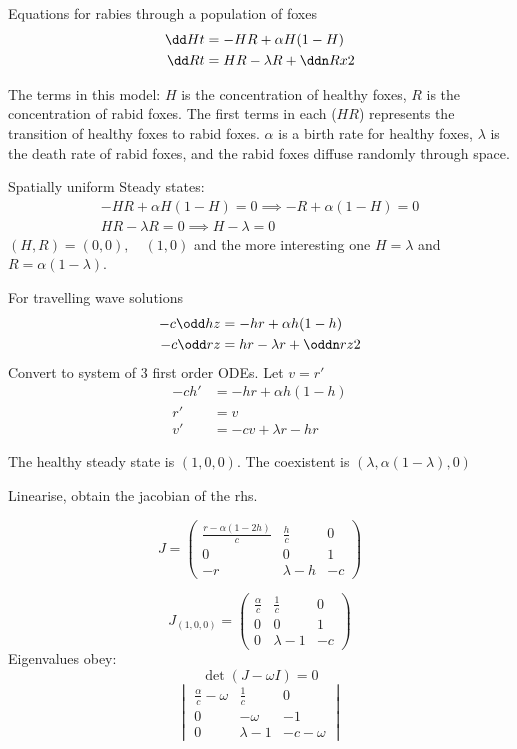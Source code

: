 \documentclass{X:/Documents/Coding/Latex/myassignment}
\begin{document}
Equations for rabies through a population of foxes
\begin{align*}
	\dd Ht &= -HR + \alpha H(1-H)\\
	\dd Rt &= HR - \lambda R + \ddn Rx2
\end{align*}

The terms in this model: $H$ is the concentration of healthy foxes, $R$ is the concentration of rabid foxes.
The first terms in each ($HR$) represents the transition of  healthy foxes to rabid foxes. $\alpha$ is a birth rate for healthy foxes, $\lambda$ is the death rate of rabid foxes, and the rabid foxes diffuse randomly through space.


Spatially uniform Steady states:
\begin{align*}
	-HR + \alpha H(1-H) = 0  \implies -R + \alpha(1-H) = 0 \\
	HR - \lambda R = 0 \implies H - \lambda = 0
\end{align*}
$(H,R) = (0,0),\quad  (1,0)$ and the more interesting one $H= \lambda$ and $R = \alpha(1- \lambda)$.

For travelling wave solutions
\begin{align*}
	- c\odd hz &= - hr + \alpha h(1-h)\\
	- c \odd rz &= hr - \lambda r + \oddn rz2
\end{align*}
Convert to system of 3 first order ODEs. Let $v = r'$
\begin{align*}
	-c h' &= -hr + \alpha h(1-h)\\
	r' &= v\\
	v' &= -c v + \lambda r - hr
\end{align*}

The healthy steady state is $(1,0,0)$. The coexistent is $(\lambda,\alpha(1- \lambda),0)$

Linearise, obtain the jacobian of the rhs.

\[J = \begin{pmatrix}
	\frac{r - \alpha(1-2h)}{c} & \frac{h}{c} & 0 \\
	0&0 &1 \\
	-r&\lambda - h & - c 
\end{pmatrix}\]

\[J_{(1,0,0)} = \begin{pmatrix}
	\frac{\alpha}{c} & \frac1c & 0 \\
	0 & 0 & 1\\
	0 & \lambda - 1 & -c
\end{pmatrix}\]
Eigenvalues obey:
\[\det(J - \omega I) = 0\]
\[\begin{vmatrix}
	\frac{\alpha}{c} - \omega& \frac 1c & 0\\
	0&-\omega&-1\\
	0& \lambda -1 &-c- \omega
\end{vmatrix}\]
\end{document}

